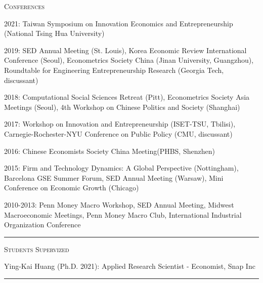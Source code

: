 \documentclass{article}
\begin{document}
\parbox{\textwidth}{
\parbox[t]{0.28\textwidth}{ \raggedright \noindent \textsc{ Conferences } }
\parbox[t]{0.72\textwidth}{ \raggedright

2021: Taiwan Symposium on Innovation Economics and Entrepreneurship (National Tsing Hua University)
\vspace{0.27cm}

2019: SED Annual Meeting (St. Louis), Korea Economic Review International Conference (Seoul), Econometrics Society China (Jinan University, Guangzhou), Roundtable for Engineering Entrepreneurship Research (Georgia Tech, discussant)
\vspace{0.27cm}

2018: Computational Social Sciences Retreat (Pitt), Econometrics Society Asia Meetings (Seoul), 4th Workshop on Chinese Politics and Society (Shanghai)
\vspace{0.27cm}

2017: Workshop on Innovation and Entrepreneurship (ISET-TSU, Tbilisi), Carnegie-Rochester-NYU Conference on Public Policy (CMU, discussant)
\vspace{0.27cm}

2016: Chinese Economists Society China Meeting(PHBS, Shenzhen)
\vspace{0.27cm}

2015: Firm and Technology Dynamics: A Global Perspective (Nottingham), Barcelona GSE Summer Forum, SED Annual Meeting (Warsaw), Mini Conference on Economic Growth (Chicago)
\vspace{0.27cm}

2010-2013: Penn Money Macro Workshop, SED Annual Meeting, Midwest Macroeconomic Meetings, Penn Money Macro Club, International Industrial Organization Conference
\vspace{0.27cm}

}
\textcolor{light-gray}{\hrule}
}
\vspace{0.3cm}

\parbox{\textwidth}{
\parbox[t]{0.28\textwidth}{ \raggedright \noindent \textsc{ Students Supervized } }
\parbox[t]{0.72\textwidth}{ \raggedright

Ying-Kai Huang (Ph.D. 2021): Applied Research Scientist - Economist, Snap Inc
\vspace{0.27cm}

}
\textcolor{light-gray}{\hrule}
}
\vspace{0.3cm}
\end{document}
